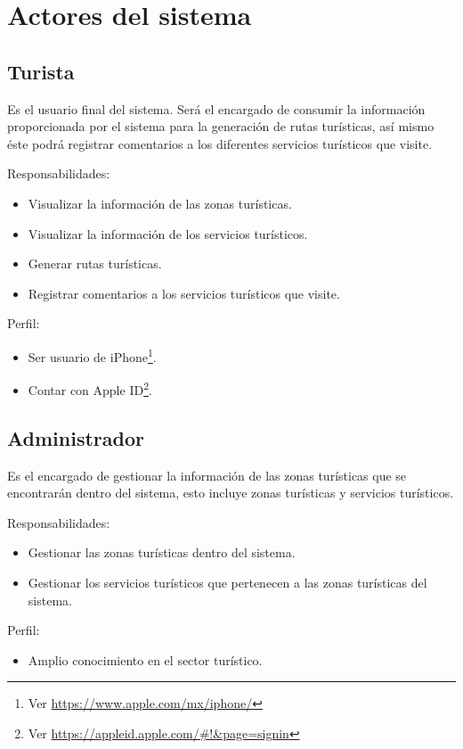 \section{Actores del sistema}

\begin{Usuario}{\hypertarget{actor:turista}{\subsection{Turista}}}{
		Es el usuario final del sistema. Será el encargado de consumir la información proporcionada por el sistema para la generación de rutas turísticas, así mismo éste podrá registrar comentarios a los diferentes servicios turísticos que visite.
	}
	\item[Responsabilidades:] \cdtEmpty
		\begin{itemize}
			\item Visualizar la información de las zonas turísticas.
			\item Visualizar la información de los servicios turísticos.
			\item Generar rutas turísticas.
			\item Registrar comentarios a los servicios turísticos que visite.
		\end{itemize}
	\item[Perfil:] \cdtEmpty
		\begin{itemize}
			\item Ser usuario de iPhone\footnote{Ver \url{https://www.apple.com/mx/iphone/}}.
			\item Contar con Apple ID\footnote{Ver \url{https://appleid.apple.com/\#!\&page=signin}}.
		\end{itemize}
\end{Usuario}

\begin{Usuario}{\hypertarget{actor:administrador}{\subsection{Administrador}}}{
		Es el encargado de gestionar la información de las zonas turísticas que se encontrarán dentro del sistema, esto incluye zonas turísticas y servicios turísticos.
	}
	\item[Responsabilidades:] \cdtEmpty
		\begin{itemize}
			\item Gestionar las zonas turísticas dentro del sistema.
			\item Gestionar los servicios turísticos que pertenecen a las zonas turísticas del sistema.
		\end{itemize}
	\item[Perfil:] \cdtEmpty
		\begin{itemize}
			\item Amplio conocimiento en el sector turístico.
		\end{itemize}
\end{Usuario}